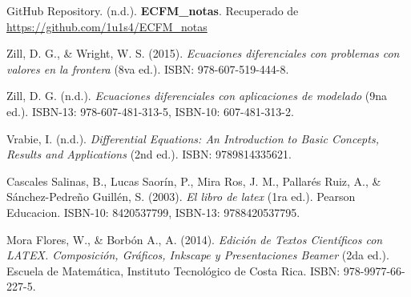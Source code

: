 \nocite{*} %

\begin{thebibliography}{9}

GitHub Repository. (n.d.). \textbf{ECFM\_notas}. Recuperado de \url{https://github.com/1u1s4/ECFM_notas}

Zill, D. G., \& Wright, W. S. (2015). \textit{Ecuaciones diferenciales con problemas con valores en la frontera} (8va ed.). ISBN: 978-607-519-444-8.

Zill, D. G. (n.d.). \textit{Ecuaciones diferenciales con aplicaciones de modelado} (9na ed.). ISBN-13: 978-607-481-313-5, ISBN-10: 607-481-313-2.

Vrabie, I. (n.d.). \textit{Differential Equations: An Introduction to Basic Concepts, Results and Applications} (2nd ed.). ISBN: 9789814335621.

Cascales Salinas, B., Lucas Saorín, P., Mira Ros, J. M., Pallarés Ruiz, A., \& Sánchez-Pedreño Guillén, S. (2003). \textit{El libro de latex} (1ra ed.). Pearson Educacion. ISBN-10: 8420537799, ISBN-13: 9788420537795.

Mora Flores, W., \& Borbón A., A. (2014). \textit{Edición de Textos Científicos con LATEX. Composición, Gráficos, Inkscape y Presentaciones Beamer} (2da ed.). Escuela de Matemática, Instituto Tecnológico de Costa Rica. ISBN: 978-9977-66-227-5.

\end{thebibliography}